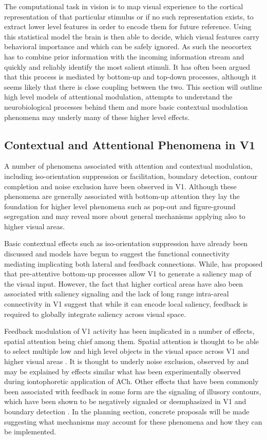 The computational task in vision is to map visual experience to the
cortical representation of that particular stimulus or if no such
representation exists, to extract lower level features in order to
encode them for future reference. Using this statistical model the
brain is then able to decide, which visual features carry behavioral
importance and which can be safely ignored. As such the neocortex has
to combine prior information with the incoming information stream and
quickly and reliably identify the most salient stimuli. It has often
been argued that this process is mediated by bottom-up and top-down
processes, although it seems likely that there is close coupling
between the two. This section will outline high level models of
attentional modulation, attempts to understand the neurobiological
processes behind them and more basic contextual modulation phenomena
may underly many of these higher level effects.

\subsection{Contextual and Attentional Phenomena in V1}

A number of phenomena associated with attention and contextual
modulation, including iso-orientation suppression or facilitation,
boundary detection, contour completion and noise exclusion have been
observed in V1. Although these phenomena are generally associated with
bottom-up attention they lay the foundation for higher level phenomena
such as pop-out and figure-ground segregation and may reveal more
about general mechanisms applying also to higher visual areas.

Basic contextual effects such as iso-orientation suppression have
already been discussed and models have begun to suggest the functional
connectivity mediating implicating both lateral and feedback
connections. While, \cite{Li2002} has proposed that pre-attentive
bottom-up processes allow V1 to generate a saliency map of the visual
input. However, the fact that higher cortical areas have also been
associated with saliency signaling and the lack of long range
intra-areal connectivity in V1 suggest that while it can encode local
saliency, feedback is required to globally integrate saliency across
visual space.

Feedback modulation of V1 activity has been implicated in a number of
effects, spatial attention being chief among them. Spatial attention
is thought to be able to select multiple low and high level objects in
the visual space across V1 and higher visual areas
\citep{McMains2004}. It is thought to underly noise exclusion,
observed by \cite{Dosher2000} and may be explained by effects similar
what has been experimentally observed during iontophoretic application
of ACh. Other effects that have been commonly been associated with
feedback in some form are the signaling of illusory contours, which
have been shown to be negatively signaled or deemphasized in V1
\citep{Ramsden2001} and boundary detection \citep{Poort2012}.  In the
planning section, concrete proposals will be made suggesting what
mechanisms may account for these phenomena and how they can be
implemented.


